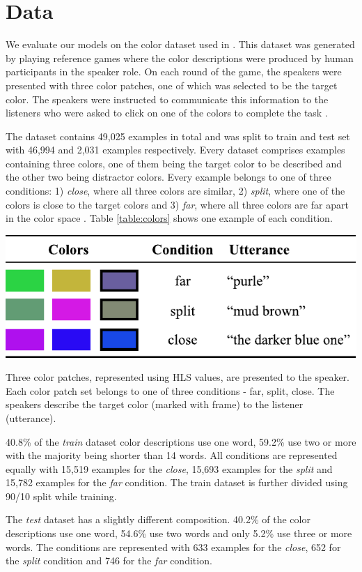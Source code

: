 \section{Data}

We evaluate our models on the color dataset used in \citep{monroe-2017-colors}. This dataset was generated by playing reference games where the color descriptions were produced by human participants in the speaker role. On each round of the game, the speakers were presented with three color patches, one of which was selected to be the target color. The speakers were instructed to communicate this information to the listeners who were asked to click on one of the colors to complete the task \citep{monroe-2017-colors}.

\par
The dataset contains 49,025 examples in total and was split to train and test set with 46,994 and 2,031 examples respectively. Every dataset comprises examples containing three colors, one of them being the target color to be described and the other two being distractor colors. Every example belongs to one of three conditions: 1) \emph{close}, where all three colors are similar, 2) \emph{split}, where one of the colors is close to the target colors and 3) \emph{far}, where all three colors are far apart in the color space \citep{monroe-2017-colors}. Table \ref{table:colors} shows one example of each condition.

\begin{table}[ht]
\centering
\includegraphics[width=\columnwidth]{assets/colors.pdf}
\caption[Colors]{Three color patches, represented using HLS values, are presented to the speaker. Each color patch set belongs to one of three conditions - far, split, close. The speakers describe the target color (marked with frame) to the listener (utterance).}
\label{table:colors}
\end{table}

\par
40.8\% of the \emph{train} dataset color descriptions use one word, 59.2\% use two or more with the majority being shorter than 14 words. All conditions are represented equally with 15,519 examples for the \emph{close}, 15,693 examples for the \emph{split} and 15,782 examples for the \emph{far} condition. The train dataset is further divided using 90/10 split while training.

\par
The \emph{test} dataset has a slightly different composition. 40.2\% of the color descriptions use one word, 54.6\% use two words and only 5.2\% use three or more words. The conditions are represented with 633 examples for the \emph{close}, 652 for the \emph{split} condition and 746 for the \emph{far} condition.